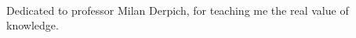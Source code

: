 \setcounter{page}{2}
\
\vfill
\vfill
\begin{flushright}
\end{flushright}

\begin{flushright}
    \noindent
    Dedicated to professor Milan Derpich, for teaching me the real value of knowledge.
\end{flushright}
\vfill